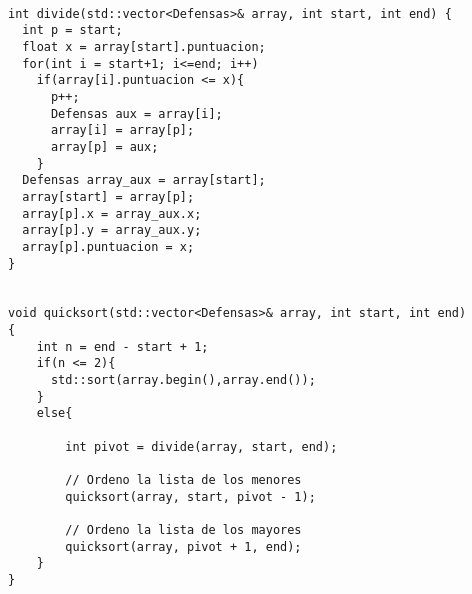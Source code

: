 \begin{lstlisting}

int divide(std::vector<Defensas>& array, int start, int end) {
  int p = start;
  float x = array[start].puntuacion;
  for(int i = start+1; i<=end; i++)
    if(array[i].puntuacion <= x){
      p++;
      Defensas aux = array[i];
      array[i] = array[p];
      array[p] = aux;
    }
  Defensas array_aux = array[start];
  array[start] = array[p];
  array[p].x = array_aux.x;
  array[p].y = array_aux.y;
  array[p].puntuacion = x;
}


void quicksort(std::vector<Defensas>& array, int start, int end)
{
    int n = end - start + 1;
    if(n <= 2){
      std::sort(array.begin(),array.end());
    }
    else{

        int pivot = divide(array, start, end);

        // Ordeno la lista de los menores
        quicksort(array, start, pivot - 1);

        // Ordeno la lista de los mayores
        quicksort(array, pivot + 1, end);
    }
}

\end{lstlisting}
